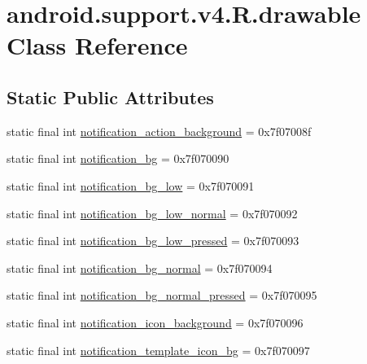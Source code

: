 \hypertarget{classandroid_1_1support_1_1v4_1_1R_1_1drawable}{}\section{android.\+support.\+v4.\+R.\+drawable Class Reference}
\label{classandroid_1_1support_1_1v4_1_1R_1_1drawable}
\subsection*{Static Public Attributes}
\begin{DoxyCompactItemize}
\item 
static final int \mbox{\hyperlink{classandroid_1_1support_1_1v4_1_1R_1_1drawable_a1c5ea12cd4bf083ceae928a72012a29d}{notification\+\_\+action\+\_\+background}} = 0x7f07008f
\item 
static final int \mbox{\hyperlink{classandroid_1_1support_1_1v4_1_1R_1_1drawable_a0d0d6a26167a46b4f5473be51838a398}{notification\+\_\+bg}} = 0x7f070090
\item 
static final int \mbox{\hyperlink{classandroid_1_1support_1_1v4_1_1R_1_1drawable_ab0f27bdda695d0483467980ff9046e64}{notification\+\_\+bg\+\_\+low}} = 0x7f070091
\item 
static final int \mbox{\hyperlink{classandroid_1_1support_1_1v4_1_1R_1_1drawable_a1e4034a8000089da45523a4dc7e7d9cc}{notification\+\_\+bg\+\_\+low\+\_\+normal}} = 0x7f070092
\item 
static final int \mbox{\hyperlink{classandroid_1_1support_1_1v4_1_1R_1_1drawable_a5cf6c1f75adafe5591e10e3f69fbfe97}{notification\+\_\+bg\+\_\+low\+\_\+pressed}} = 0x7f070093
\item 
static final int \mbox{\hyperlink{classandroid_1_1support_1_1v4_1_1R_1_1drawable_aaba29d4510a5dd4a4595e2aedb7c4984}{notification\+\_\+bg\+\_\+normal}} = 0x7f070094
\item 
static final int \mbox{\hyperlink{classandroid_1_1support_1_1v4_1_1R_1_1drawable_a5307ce5ac425f1c9e26198d2cb916bad}{notification\+\_\+bg\+\_\+normal\+\_\+pressed}} = 0x7f070095
\item 
static final int \mbox{\hyperlink{classandroid_1_1support_1_1v4_1_1R_1_1drawable_a15cc24da0548b407fa8a5ebb927077dd}{notification\+\_\+icon\+\_\+background}} = 0x7f070096
\item 
static final int \mbox{\hyperlink{classandroid_1_1support_1_1v4_1_1R_1_1drawable_afa9eae4b4d22f976ab7ed0d53cc43d96}{notification\+\_\+template\+\_\+icon\+\_\+bg}} = 0x7f070097

\end{DoxyCompactItemize}
